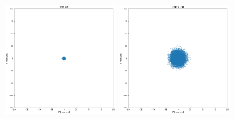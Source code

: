 \documentclass[12pt]{article}
\begin{document}
  \begin{figure}[H]
    \centering 
    \includegraphics[width = 0.45\textwidth]{./RK4/RK4_0.png}
    \includegraphics[width = 0.45\textwidth]{./RK4/RK4_2.png}
  \end{figure}
\end{document}
